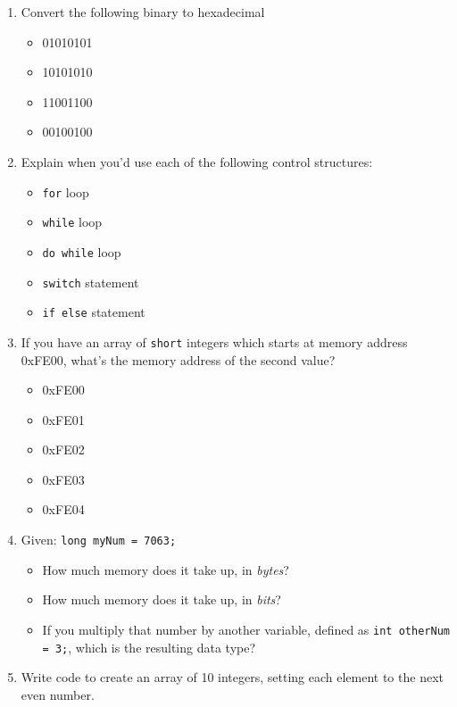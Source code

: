 \documentclass[letter,11pt]{article}
\begin{document}
\begin{enumerate}
    \item Convert the following binary to hexadecimal
    \begin{itemize}
        \item 01010101
        \item 10101010
        \item 11001100
        \item 00100100
    \end{itemize}
    
    \item Explain when you'd use each of the following control structures:
    \begin{itemize}
        \item \texttt{for} loop
        \item \texttt{while} loop
        \item \texttt{do while} loop
        \item \texttt{switch} statement
        \item \texttt{if else} statement
    \end{itemize}
    
    \item If you have an array of \texttt{short} integers which starts at memory address 0xFE00, what's the memory address of the second value?
    \begin{itemize}
        \item 0xFE00
        \item 0xFE01
        \item 0xFE02
        \item 0xFE03
        \item 0xFE04
    \end{itemize}
    
    \item Given: \texttt{long myNum = 7063;}
    \begin{itemize}
        \item How much memory does it take up, in \textit{bytes}?
        \item How much memory does it take up, in \textit{bits}?
        \item If you multiply that number by another variable, defined as \texttt{int otherNum = 3;}, which is the resulting data type?
    \end{itemize}
    
    \item Write code to create an array of 10 integers, setting each element to the next even number.
    

\end{enumerate}
\end{document}
